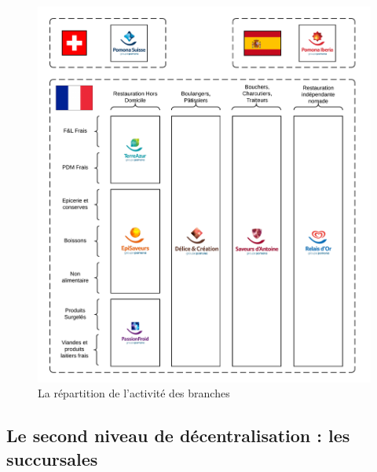                 \begin{figure}[htpb]
                    \begin{center}
                    \includegraphics[width=\linewidth]{img/La répartition de l'activité des branches.png}
                    \end{center}
                    \caption{La répartition de l'activité des branches}
                    \label{fig:repartition_activite}
                \end{figure}

            \subsection{Le second niveau de décentralisation : les succursales}

